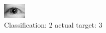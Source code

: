 \begin{figure}[h!]
\begin{center}
\includegraphics[width=0.60\columnwidth]{figures/ID3093_class_2_target_3.png}
\end{center}
\caption{ Classification: 2 actual target: 3}
\label{fig:ID3093_class_2_target_3}
\end{figure}
